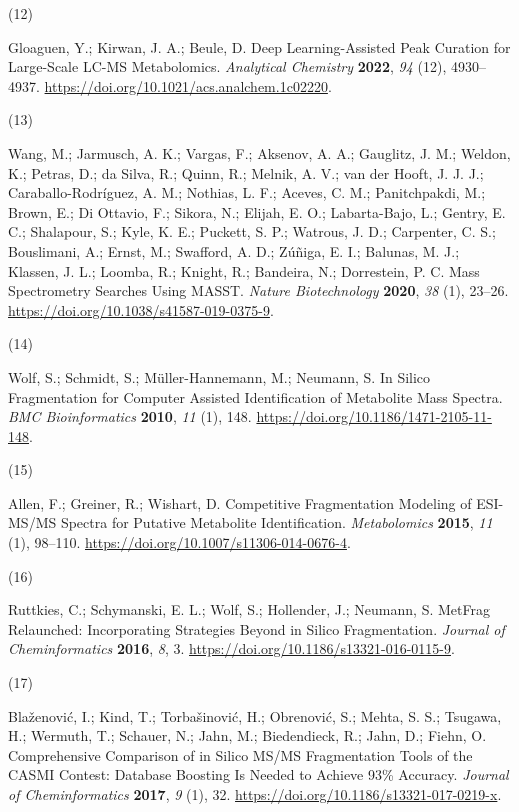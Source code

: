 \documentclass[
]{article}
\newlength{\cslhangindent}
\newlength{\csllabelwidth}
\newlength{\cslentryspacingunit} %
\newenvironment{CSLReferences}[2] %
 {%
  \setlength{\parindent}{0pt}
  \ifodd #1
  \let\oldpar\par
  \def\par{\hangindent=\cslhangindent\oldpar}
  \fi
  \setlength{\parskip}{#2\cslentryspacingunit}
 }%
 {}
\newcommand{\CSLLeftMargin}[1]{\parbox[t]{\csllabelwidth}{#1}}
\newcommand{\CSLRightInline}[1]{\parbox[t]{\linewidth - \csllabelwidth}{#1}\break}
\begin{document}
\begin{CSLReferences}{0}{0}
\leavevmode{}%
\CSLLeftMargin{(12) }%
\CSLRightInline{Gloaguen, Y.; Kirwan, J. A.; Beule, D. Deep
{Learning-Assisted Peak Curation} for {Large-Scale LC-MS Metabolomics}.
\emph{Analytical Chemistry} \textbf{2022}, \emph{94} (12), 4930--4937.
\url{https://doi.org/10.1021/acs.analchem.1c02220}.}

\leavevmode{}%
\CSLLeftMargin{(13) }%
\CSLRightInline{Wang, M.; Jarmusch, A. K.; Vargas, F.; Aksenov, A. A.;
Gauglitz, J. M.; Weldon, K.; Petras, D.; da Silva, R.; Quinn, R.;
Melnik, A. V.; van der Hooft, J. J. J.; Caraballo-Rodríguez, A. M.;
Nothias, L. F.; Aceves, C. M.; Panitchpakdi, M.; Brown, E.; Di Ottavio,
F.; Sikora, N.; Elijah, E. O.; Labarta-Bajo, L.; Gentry, E. C.;
Shalapour, S.; Kyle, K. E.; Puckett, S. P.; Watrous, J. D.; Carpenter,
C. S.; Bouslimani, A.; Ernst, M.; Swafford, A. D.; Zúñiga, E. I.;
Balunas, M. J.; Klassen, J. L.; Loomba, R.; Knight, R.; Bandeira, N.;
Dorrestein, P. C. Mass Spectrometry Searches Using {MASST}. \emph{Nature
Biotechnology} \textbf{2020}, \emph{38} (1), 23--26.
\url{https://doi.org/10.1038/s41587-019-0375-9}.}

\leavevmode{}%
\CSLLeftMargin{(14) }%
\CSLRightInline{Wolf, S.; Schmidt, S.; Müller-Hannemann, M.; Neumann, S.
In Silico Fragmentation for Computer Assisted Identification of
Metabolite Mass Spectra. \emph{BMC Bioinformatics} \textbf{2010},
\emph{11} (1), 148. \url{https://doi.org/10.1186/1471-2105-11-148}.}

\leavevmode{}%
\CSLLeftMargin{(15) }%
\CSLRightInline{Allen, F.; Greiner, R.; Wishart, D. Competitive
Fragmentation Modeling of {ESI-MS}/{MS} Spectra for Putative Metabolite
Identification. \emph{Metabolomics} \textbf{2015}, \emph{11} (1),
98--110. \url{https://doi.org/10.1007/s11306-014-0676-4}.}

\leavevmode{}%
\CSLLeftMargin{(16) }%
\CSLRightInline{Ruttkies, C.; Schymanski, E. L.; Wolf, S.; Hollender,
J.; Neumann, S. {MetFrag} Relaunched: Incorporating Strategies Beyond in
Silico Fragmentation. \emph{Journal of Cheminformatics} \textbf{2016},
\emph{8}, 3. \url{https://doi.org/10.1186/s13321-016-0115-9}.}

\leavevmode{}%
\CSLLeftMargin{(17) }%
\CSLRightInline{Blaženović, I.; Kind, T.; Torbašinović, H.; Obrenović,
S.; Mehta, S. S.; Tsugawa, H.; Wermuth, T.; Schauer, N.; Jahn, M.;
Biedendieck, R.; Jahn, D.; Fiehn, O. Comprehensive Comparison of in
Silico {MS}/{MS} Fragmentation Tools of the {CASMI} Contest: Database
Boosting Is Needed to Achieve 93\% Accuracy. \emph{Journal of
Cheminformatics} \textbf{2017}, \emph{9} (1), 32.
\url{https://doi.org/10.1186/s13321-017-0219-x}.}


\end{CSLReferences}
\end{document}

